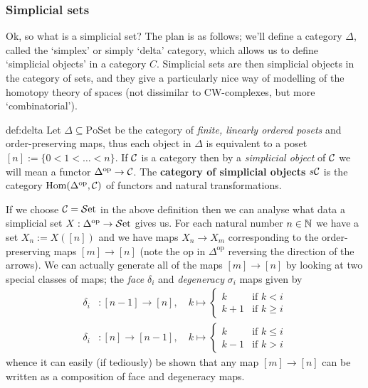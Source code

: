 \subsubsection{Simplicial sets}
Ok, so what is a simplicial set? The plan is as follows; we'll define a category $\Delta$, called the `simplex' or simply `delta' category, which allows us to define `simplicial objects' in a category $C$. Simplicial sets are then simplicial objects in the category of sets, and they give a particularly nice way of modelling of the homotopy theory of spaces (not dissimilar to CW-complexes, but more `combinatorial'). 

\begin{definition}{def:delta}
	Let $\Delta \subseteq \text{PoSet}$ be the category of \textit{finite, linearly ordered posets} and order-preserving maps, thus each object in $\Delta$ is equivalent to a poset $[n] := \{0 < 1 < \dots < n\}$. If ${\mathcal{C}}$ is a category then by a \textit{simplicial object} of ${\mathcal{C}}$ we will mean a functor $\Delta^\text{op} \to {\mathcal{C}}$. The \textbf{category of simplicial objects} $s{\mathcal{C}}$ is the category ${\text{Hom}}(\Delta^\text{op},{\mathcal{C}})$ of functors and natural transformations. 
\end{definition}

If we choose ${\mathcal{C}} = {\mathcal{S}\text{et}}$ in the above definition then we can analyse what data a simplicial set $X : \Delta^\text{op} \to {\mathcal{S}\text{et}}$ gives us. For each natural number $n \in \mathbb{N}$ we have a set $X_n := X([n])$ and we have maps $X_n \to X_m$ corresponding to the order-preserving maps $[m] \to [n]$ (note the op in $\Delta^\text{op}$ reversing the direction of the arrows). We can actually generate all of the maps $[m]\to[n]$ by looking at two special classes of maps; the \textit{face} $\delta_i$ and \textit{degeneracy} $\sigma_i$ maps given by
	\begin{align*}
		\delta_i &: [n-1] \to [n],
		\quad k \mapsto
		\begin{cases}
			k	&\text{if } k < i \\
			k+1	&\text{if } k \geq i
		\end{cases}
	\\
		\delta_i &: [n] \to [n-1],
		\quad k \mapsto
		\begin{cases}
			k	&\text{if } k \leq i \\
			k-1	&\text{if } k > i
		\end{cases}
	\end{align*}
	whence it can easily (if tediously) be shown that any map $[m] \to [n]$ can be written as a composition of face and degeneracy maps. 

